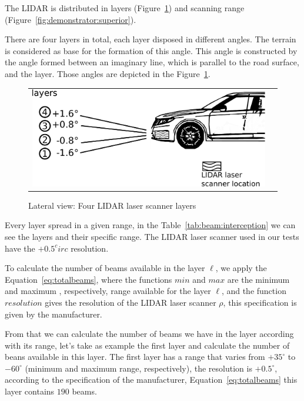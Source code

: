 The LIDAR is distributed in layers (Figure~\ref{fig:demonstrator:lateral}) and scanning range (Figure~\ref{fig:demonstrator:superior}). 

There are four layers in total, each layer disposed in different angles. The terrain is considered as base for the formation of this angle. This angle is constructed by the angle formed between an imaginary line, which is parallel to the road surface, and the layer. Those angles are depicted in the Figure~\ref{fig:demonstrator:lateral}.

\begin{figure}[h]
   \centering
     \begin{tabular}{lr}
       \includegraphics[scale=0.5]{img/fig:demonstrator:lateral}
     \end{tabular}
   \caption{Lateral view: Four LIDAR laser scanner layers}
   \label{fig:demonstrator:lateral}
\end{figure}

Every layer spread in a given range, in the Table~\ref{tab:beam:interception} we can see the layers and their specific range. The LIDAR laser scanner used in our tests have the $+0.5^circ$ resolution. 

To calculate the number of beams available in the layer $\ell$, we apply the Equation~\ref{eq:totalbeams}, where the functions $min$ and $max$ are the minimum and maximum  , respectively, range available for the layer $\ell$, and the function $resolution$ gives the resolution of the LIDAR laser scanner $\rho$, this specification is given by the manufacturer. 

From that we can calculate the number of beams we have in the layer according with its range, let's take as example the first layer and calculate the number of beans available in this layer. The first layer has a range that varies from $+35^\circ$ to $-60^\circ$ (minimum and maximum range, respectively), the resolution is $+0.5^\circ$, according to the specification of the manufacturer, Equation~\ref{eq:totalbeams} this layer contains $190$ beams.

